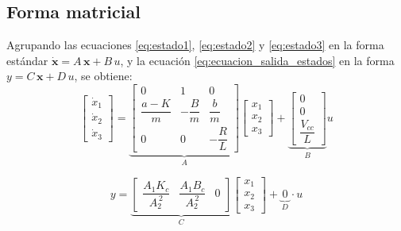 \documentclass[journal]{IEEEtran}
\begin{document}
\subsection{Forma matricial}

Agrupando las ecuaciones \eqref{eq:estado1}, \eqref{eq:estado2} y 
\eqref{eq:estado3} en la forma estándar 
$\dot{\mathbf{x}} = A\,\mathbf{x} + B\,u$, y la ecuación 
\eqref{eq:ecuacion_salida_estados} en la forma 
$y = C\,\mathbf{x} + D\,u$, se obtiene:
\begin{equation}
    \begin{bmatrix}
        \dot{x}_1 \\[4pt]
        \dot{x}_2 \\[4pt]
        \dot{x}_3
    \end{bmatrix}
    =
    \underbrace{
    \begin{bmatrix}
        0 & 1 & 0 \\[4pt]
        \dfrac{a-K}{m} & -\dfrac{B}{m} & \dfrac{b}{m} \\[8pt]
        0 & 0 & -\dfrac{R}{L}
    \end{bmatrix}
    }_{A}
    \begin{bmatrix}
        x_1 \\[4pt]
        x_2 \\[4pt]
        x_3
    \end{bmatrix}
    +
    \underbrace{
    \begin{bmatrix}
        0 \\[4pt]
        0 \\[4pt]
        \dfrac{V_{cc}}{L}
    \end{bmatrix}
    }_{B}
    u
\label{eq:espacio_estados_dinamica}
\end{equation}

\begin{equation}
    y = 
    \underbrace{
    \begin{bmatrix}
        \dfrac{A_1 K_c}{A_2^{\,2}} & \dfrac{A_1 B_c}{A_2^{\,2}} & 0
    \end{bmatrix}
    }_{C}
    \begin{bmatrix}
        x_1 \\[4pt]
        x_2 \\[4pt]
        x_3
    \end{bmatrix}
    + 
    \underbrace{\,0\,}_{D} \cdot u
\label{eq:espacio_estados_salida}
\end{equation}

\setlength{\parskip}{1em}
\end{document}
